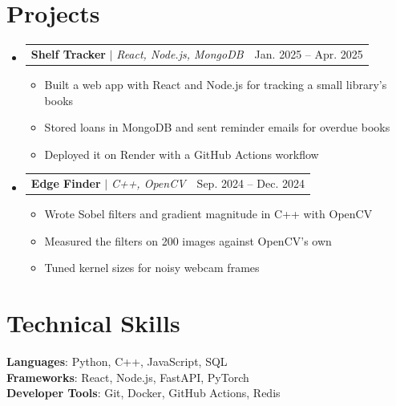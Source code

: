 \documentclass[letterpaper,11pt]{article}
\makeatletter
\newcommand{\resumeItem}[1]{
  \item\small{
    {#1 \vspace{-2pt}}
  }
}
\newcommand{\resumeProjectHeading}[2]{
    \item
    \begin{tabular*}{0.97\textwidth}{l@{\extracolsep{\fill}}r}
      \small#1 & #2 \\
    \end{tabular*}\vspace{-7pt}
}
\newcommand{\resumeSubHeadingListStart}{\begin{itemize}[leftmargin=0.15in, label={}]}
\newcommand{\resumeSubHeadingListEnd}{\end{itemize}}
\newcommand{\resumeItemListStart}{\begin{itemize}}
\newcommand{\resumeItemListEnd}{\end{itemize}\vspace{-5pt}}
\makeatother
\begin{document}
\section{Projects}
    \resumeSubHeadingListStart
      \resumeProjectHeading
          {\textbf{Shelf Tracker} $|$ \emph{React, Node.js, MongoDB}}{Jan. 2025 -- Apr. 2025}
          \resumeItemListStart
            \resumeItem{Built a web app with React and Node.js for tracking a small library's books}
            \resumeItem{Stored loans in MongoDB and sent reminder emails for overdue books}
            \resumeItem{Deployed it on Render with a GitHub Actions workflow}
          \resumeItemListEnd
      \resumeProjectHeading
          {\textbf{Edge Finder} $|$ \emph{C++, OpenCV}}{Sep. 2024 -- Dec. 2024}
          \resumeItemListStart
            \resumeItem{Wrote Sobel filters and gradient magnitude in C++ with OpenCV}
            \resumeItem{Measured the filters on 200 images against OpenCV's own}
            \resumeItem{Tuned kernel sizes for noisy webcam frames}
          \resumeItemListEnd
    \resumeSubHeadingListEnd


\section{Technical Skills}
 \begin{itemize}[leftmargin=0.15in, label={}]
    \small{\item{
     \textbf{Languages}{: Python, C++, JavaScript, SQL} \\
     \textbf{Frameworks}{: React, Node.js, FastAPI, PyTorch} \\
     \textbf{Developer Tools}{: Git, Docker, GitHub Actions, Redis}
    }}
 \end{itemize}
\end{document}
